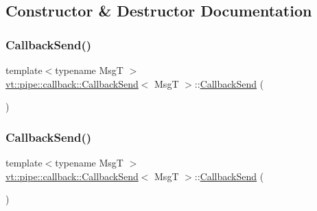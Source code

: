 \subsection{Constructor \& Destructor Documentation}
\mbox{\label{structvt_1_1pipe_1_1callback_1_1_callback_send_aad073e948c05410190ba09425772d3a3}} 
\subsubsection{\texorpdfstring{Callback\+Send()}{CallbackSend()}\hspace{0.1cm}{\footnotesize\ttfamily [1/4]}}
{\footnotesize\ttfamily template$<$typename MsgT $>$ \\
\hyperlink{structvt_1_1pipe_1_1callback_1_1_callback_send}{vt\+::pipe\+::callback\+::\+Callback\+Send}$<$ MsgT $>$\+::\hyperlink{structvt_1_1pipe_1_1callback_1_1_callback_send}{Callback\+Send} (\begin{DoxyParamCaption}{ }\end{DoxyParamCaption})\hspace{0.3cm}{\ttfamily [default]}}

\mbox{\label{structvt_1_1pipe_1_1callback_1_1_callback_send_ae45cdb5d7d006708d6bbae455c4a22d1}} 
\subsubsection{\texorpdfstring{Callback\+Send()}{CallbackSend()}\hspace{0.1cm}{\footnotesize\ttfamily [2/4]}}
{\footnotesize\ttfamily template$<$typename MsgT $>$ \\
\hyperlink{structvt_1_1pipe_1_1callback_1_1_callback_send}{vt\+::pipe\+::callback\+::\+Callback\+Send}$<$ MsgT $>$\+::\hyperlink{structvt_1_1pipe_1_1callback_1_1_callback_send}{Callback\+Send} (\begin{DoxyParamCaption}\item[{\hyperlink{structvt_1_1pipe_1_1callback_1_1_callback_send}{Callback\+Send}$<$ MsgT $>$ const \&}]{ }\end{DoxyParamCaption})\hspace{0.3cm}{\ttfamily [default]}}

